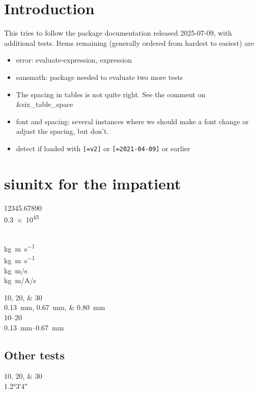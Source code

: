 \documentclass{article}
\begin{document}
{\sloppy
\tableofcontents
}

\section{Introduction}

This tries to follow the package documentation released 2025-07-09, with additional tests.  Items remaining (generally ordered from hardest to easiest) are
\begin{itemize}
\item error: evaluate-expression, expression  %
\item sansmath: package needed to evaluate two more tests
\item The spacing in tables is not quite right.  See the comment on \&six\_table\_space
\item font and spacing: several instances where we should make a font change or adjust the spacing, but don't.  %
\item detect if loaded with \verb|[=v2]| or \verb|[=2021-04-09]| or earlier  %
\end{itemize}

\section{siunitx for the impatient}
\num{12345,67890}\\
\num{.3e45}\\
\\

\unit{kg.m.s^{-1}} \\
\unit{\kilogram\metre\per\second} \\
\unit[per-mode = symbol]{\kilogram\metre\per\second} \\
\unit[per-mode = symbol]{\kilogram\metre\per\ampere\per\second}

\numlist{10;20;30} \\
\qtylist{0.13;0.67;0.80}{\milli\metre} \\
\numrange{10}{20} \\
\qtyrange{0.13}{0.67}{\milli\metre}

\subsection*{Other tests}
\numlist{10 ; 20 ; 30} \\
\ang{1.2;3;4}
\end{document}
